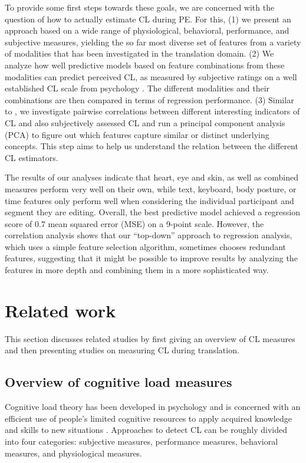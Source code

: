 \documentclass[output=paper]{langsci/langscibook}
\begin{document}
To provide some first steps towards these goals, we are concerned with the question of how to actually estimate CL during PE. For this,
(1) we present an approach based on a wide range of physiological, behavioral, performance, and subjective measures, yielding the so far most diverse set of features from a variety of modalities that has been investigated in the translation domain.
(2) We analyze how well predictive models based on feature combinations from these modalities can predict perceived CL, as measured by subjective ratings on a well established CL scale from psychology \citep{paas1994instructional}. The different modalities and their combinations are then compared in terms of regression performance.
(3) Similar to \citet{vieira2016measures}, we investigate pairwise correlations between different interesting indicators of CL and also subjectively assessed CL and run a principal component analysis (PCA) to figure out which features capture similar or distinct underlying concepts. This step aims to help us understand the relation between the different CL estimators.

The results of our analyses indicate that heart, eye and skin, as well as combined measures perform very well on their own, while text, keyboard, body posture, or time features only perform well when considering the individual participant and segment they are editing. Overall, the best predictive model achieved a regression score of 0.7 mean squared error (MSE) on a 9-point scale. However, the correlation analysis shows that our ``top-down'' approach to regression analysis, which uses a simple feature selection algorithm, sometimes chooses redundant features, suggesting that it might be possible to improve results by analyzing the features in more depth and combining them in a more sophisticated way.

\section{Related work}
This section discusses related studies by first giving an overview of CL measures and then presenting studies on %
measuring CL during translation.

\subsection{Overview of cognitive load measures}
Cognitive load theory \citep{paas1994instructional, sweller1998cognitive} has been developed in psychology and is concerned with an efficient use of people's limited cognitive resources to apply acquired knowledge and skills to new situations \citep{paas2003cognitive}. Approaches to detect CL can be roughly divided into four categories: subjective measures, performance measures, behavioral measures, and physiological measures.
\end{document}
